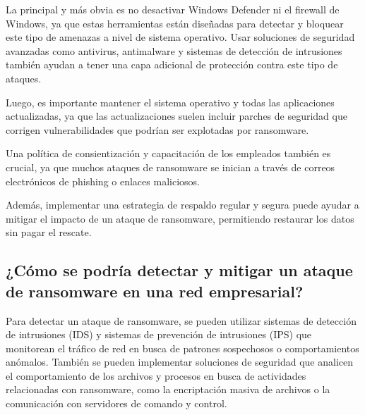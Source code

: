 La principal y más obvia es no desactivar Windows Defender ni el firewall de Windows, ya que estas herramientas 
están diseñadas para detectar y bloquear este tipo de amenazas a nivel de sistema operativo. Usar soluciones de 
seguridad avanzadas como antivirus, antimalware y sistemas de detección de intrusiones también ayudan a tener
una capa adicional de protección contra este tipo de ataques.

Luego, es importante mantener el sistema operativo y todas las aplicaciones actualizadas, ya que las actualizaciones 
suelen incluir parches de seguridad que corrigen vulnerabilidades que podrían ser explotadas por ransomware. 

Una política de consientización y capacitación de los empleados también es crucial, ya que muchos ataques de 
ransomware se inician a través de correos electrónicos de phishing o enlaces maliciosos. 

Además, implementar una estrategia de respaldo regular y segura puede ayudar a mitigar el impacto de un ataque 
de ransomware, permitiendo restaurar los datos sin pagar el rescate. 

\subsection{¿Cómo se podría detectar y mitigar un ataque de ransomware en una red empresarial?}

Para detectar un ataque de ransomware, se pueden utilizar sistemas de detección de intrusiones (IDS) y 
sistemas de prevención de intrusiones (IPS) que monitorean el tráfico de red en busca de patrones sospechosos
o comportamientos anómalos. También se pueden implementar soluciones de seguridad que analicen el comportamiento 
de los archivos y procesos en busca de actividades relacionadas con ransomware, como la encriptación masiva de 
archivos o la comunicación con servidores de comando y control.